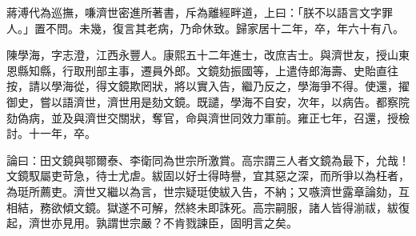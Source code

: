 \begin{pinyinscope}
蔣溥代為巡撫，嗛濟世密進所著書，斥為離經畔道，上曰：「朕不以語言文字罪人。」置不問。未幾，復言其老病，乃命休致。歸家居十二年，卒，年六十有八。

陳學海，字志澄，江西永豐人。康熙五十二年進士，改庶吉士。與濟世友，授山東恩縣知縣，行取刑部主事，遷員外郎。文鏡劾振國等，上遣侍郎海壽、史貽直往按，請以學海從，得文鏡欺罔狀，將以實入告，繼乃反之，學海爭不得。使還，擢御史，嘗以語濟世，濟世用是劾文鏡。既譴，學海不自安，次年，以病告。都察院劾偽病，並及與濟世交關狀，奪官，命與濟世同效力軍前。雍正七年，召還，授檢討。十一年，卒。

論曰：田文鏡與鄂爾泰、李衛同為世宗所激賞。高宗謂三人者文鏡為最下，允哉！文鏡馭屬吏苛急，待士尤虐。紱固以好士得時譽，宜其惡之深，而所爭以為枉者，為珽所薦吏。濟世又繼以為言，世宗疑珽使紱入告，不納；又嗾濟世露章論劾，互相結，務欲傾文鏡。獄遂不可解，然終未即誅死。高宗嗣服，諸人皆得湔祓，紱復起，濟世亦見用。孰謂世宗嚴？不肯戮諫臣，固明言之矣。


\end{pinyinscope}